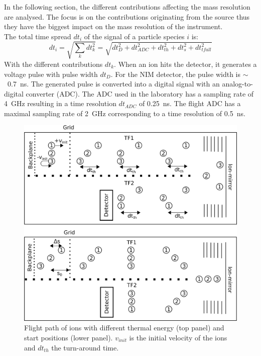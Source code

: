 	In the following section, the different contributions affecting the mass resolution are analysed. The focus is on the contributions originating from the source thus they have the biggest impact on the mass resolution of the instrument.\\
	The total time spread $dt_i$ of the signal of a particle species $i$ is:
	\begin{equation}
		dt_i = \sqrt{\sum_{k} dt_k^2} = \sqrt{dt_D^2 + dt_{ADC}^2 + dt_{th}^2 + dt_{s}^2 + dt_{tfall}^2} 
	\end{equation}
	With the different contributions $dt_k$. When an ion hits the detector, it generates a voltage pulse with pulse width $dt_D$. For the NIM detector, the pulse width is $\sim$~0.7~ns. The generated pulse is converted into a digital signal with an analog-to-digital converter (ADC). The ADC used in the laboratory has a sampling rate of 4~GHz resulting in a time resolution $dt_{ADC}$ of 0.25~ns. The flight ADC has a maximal sampling rate of 2~GHz corresponding to a time resolution of 0.5~ns.\\
	\begin{figure}[h] %
		\centering
		\includegraphics[width= \textwidth]{Bilder/ISStartPosThermEn.png}
		\caption{Flight path of ions with different thermal energy (top panel) and start positions (lower panel). $v_{init}$ is the initial velocity of the ions and $dt_{th}$ the turn-around time.}
		\label{fig:thISStartPosThermEn}
	\end{figure}
